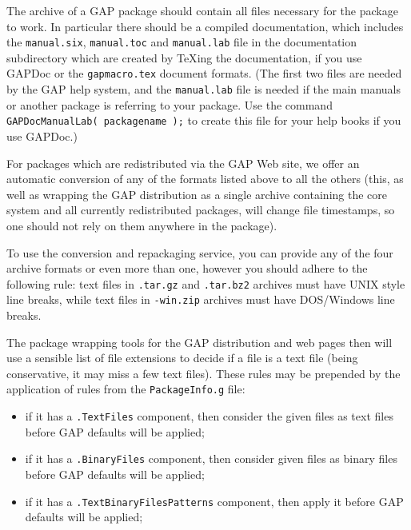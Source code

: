 \documentclass[a4paper,11pt]{report}
\begin{document}
{{  The archive of a \textsf{GAP} package should contain all files necessary for the package to work. In
particular there should be a compiled documentation, which includes the \texttt{manual.six}, \texttt{manual.toc} and \texttt{manual.lab} file in the documentation subdirectory which are created by {\TeX}ing the documentation, if you use \textsf{GAPDoc} or the \texttt{gapmacro.tex} document formats. (The first two files are needed by the \textsf{GAP} help system, and the \texttt{manual.lab} file is needed if the main manuals or another package is referring to your
package. Use the command \texttt{GAPDocManualLab( packagename );} to create this file for your help books if you use \textsf{GAPDoc}.) 

 For packages which are redistributed via the \textsf{GAP} Web site, we offer an automatic conversion of any of the formats listed above
to all the others (this, as well as wrapping the \textsf{GAP} distribution as a single archive containing the core system and all currently
redistributed packages, will change file timestamps, so one should not rely on
them anywhere in the package). 

 To use the conversion and repackaging service, you can provide any of the four
archive formats or even more than one, however you should adhere to the
following rule: text files in \texttt{.tar.gz} and \texttt{.tar.bz2} archives must have UNIX style line breaks, while text files in \texttt{-win.zip} archives must have DOS/Windows line breaks. 

 The package wrapping tools for the \textsf{GAP} distribution and web pages then will use a sensible list of file extensions to
decide if a file is a text file (being conservative, it may miss a few text
files). These rules may be prepended by the application of rules from the \texttt{PackageInfo.g} file: 
\begin{itemize}
\item  if it has a \texttt{.TextFiles} component, then consider the given files as text files before \textsf{GAP} defaults will be applied; 
\item  if it has a \texttt{.BinaryFiles} component, then consider given files as binary files before \textsf{GAP} defaults will be applied; 
\item  if it has a \texttt{.TextBinaryFilesPatterns} component, then apply it before \textsf{GAP} defaults will be applied; 
\end{itemize}
 

}}
\end{document}
